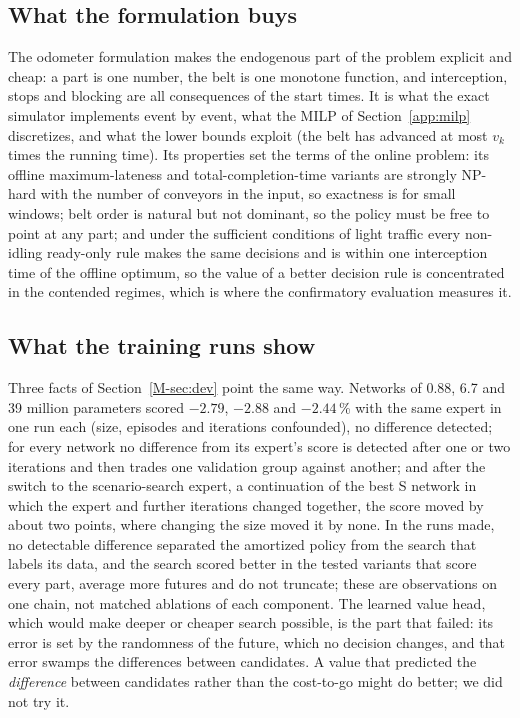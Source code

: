 \documentclass[11pt,a4paper]{article}
\theoremstyle{plain}
\theoremstyle{definition}
\theoremstyle{remark}
\begin{document}
\subsection{What the formulation buys}
The odometer formulation makes the endogenous part of the problem explicit and cheap: a
part is one number, the belt is one monotone function, and interception, stops and
blocking are all consequences of the start times. It is what the exact simulator
implements event by event, what the MILP of Section~\ref{app:milp} discretizes, and what
the lower bounds exploit (the belt has advanced at most $v_k$ times the running time).
Its properties set the terms of the online problem: its offline maximum-lateness and
total-completion-time variants are strongly NP-hard with the number of conveyors in the
input, so exactness is for small windows; belt order is natural but not dominant, so the policy must
be free to point at any part; and under the sufficient conditions of light traffic every
non-idling ready-only rule makes the same decisions and is within one interception time
of the offline optimum, so the value of
a better decision rule is concentrated in the contended regimes, which is where the
confirmatory evaluation measures it.

\subsection{What the training runs show}
Three facts of Section~\ref{M-sec:dev} point the same way. Networks of 0.88, 6.7 and 39
million parameters scored $-2.79$, $-2.88$ and $-2.44$\,\% with the same expert in one
run each (size, episodes and iterations confounded), no difference detected; for every network no difference from its expert's score is detected after one or two iterations and then trades one validation group against
another; and after the switch to the scenario-search expert, a continuation of the best S
network in which the expert and further iterations changed together, the score moved by
about two points, where changing the size moved it by none. In the runs made, no detectable difference separated the amortized
policy from the search that labels its data, and the search scored better in the tested variants that score
every part, average more futures and do not truncate; these are observations on one
chain, not matched ablations of each component. The learned value
head, which would make deeper or cheaper search possible, is the part that failed: its
error is set by the randomness of the future, which no decision changes, and that error
swamps the differences between candidates. A value that predicted the \emph{difference}
between candidates rather than the cost-to-go might do better; we did not try it.
\end{document}
